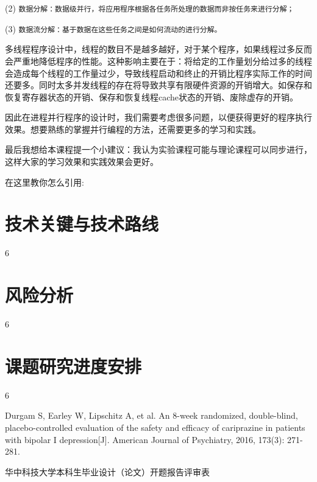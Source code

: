 \documentclass[supercite]{Experimental_Report}
\theoremstyle{definition}
\begin{document}
(2) \texttt{数据分解：数据级并行，将应用程序根据各任务所处理的数据而非按任务来进行分解；}

(3) \texttt{数据流分解：基于数据在这些任务之间是如何流动的进行分解。}

多线程程序设计中，线程的数目不是越多越好，对于某个程序，如果线程过多反而会严重地降低程序的性能。这种影响主要在于：将给定的工作量划分给过多的线程会造成每个线程的工作量过少，导致线程启动和终止的开销比程序实际工作的时间还要多。同时太多并发线程的存在将导致共享有限硬件资源的开销增大。如保存和恢复寄存器状态的开销、保存和恢复线程cache状态的开销、废除虚存的开销。

因此在进程并行程序的设计时，我们需要考虑很多问题，以便获得更好的程序执行效果。想要熟练的掌握并行编程的方法，还需要更多的学习和实践。

最后我想给本课程提一个小建议：我认为实验课程可能与理论课程可以同步进行，这样大家的学习效果和实践效果会更好。

在这里教你怎么引用:\cite{ref1}


\section{技术关键与技术路线}
6
\section{风险分析}
6
\section{课题研究进度安排}
6

\begin{thebibliography}{99}  

  Durgam S, Earley W, Lipschitz A, et al. An 8-week randomized, double-blind, placebo-controlled evaluation of the safety and efficacy of cariprazine in patients with bipolar I depression[J]. American Journal of Psychiatry, 2016, 173(3): 271-281.
  
  \end{thebibliography}
\clearpage

\centerline{ \heiti 华中科技大学本科生毕业设计（论文）开题报告评审表}
\thispagestyle{empty}
\end{document}
